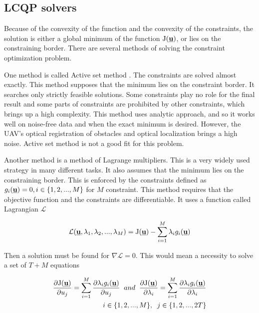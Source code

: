 \documentclass[a4paper,11pt,titlepage]{article}
\newcommand{\Lagr}{\mathcal{L}}
\newcommand{\uvec}{\textbf{\underline{u}}}
\newcommand{\macJ}{\mathrm{J}(\uvec)}
\begin{document}
\subsection{LCQP solvers}

Because of the convexity of the function and the convexity of the constraints, the solution is either a global minimum of the function $\macJ$, or lies on the constraining border. There are several methods of solving the constraint optimization problem.

One method is called Active set method \cite{schittkowski1983convergence}. The constraints are solved almost exactly. This method supposes that the minimum lies on the constraint border. It searches only strictly feasible solutions. Some constraints play no role for the final result and some parts of constraints are prohibited by other constraints, which brings up a high complexity. This method uses analytic approach, and so it works well on noise-free data and when the exact minimum is desired. However, the UAV's optical registration of obstacles and optical localization brings a high noise. Active set method is not a good fit for this problem.

Another method is a method of Lagrange multipliers. This is a very widely used strategy in many different tasks. It also assumes that the minimum lies on the constraining border. This is enforced by the constraints defined as $g_i(\uvec) = 0, i \in \{1, 2, ..., M\}$ for $M$ constraint. This method requires that the objective function and the constraints are differentiable. It uses a function called Lagrangian $\Lagr$

\begin{equation}
\label{Lagrangian}
\Lagr(\uvec, \lambda_1, \lambda_2, ..., \lambda_M) = \mathrm{J}(\uvec) - \sum_{i = 1}^M \lambda_i g_i(\uvec)
\end{equation}

Then a solution must be found for $\nabla \Lagr = 0$. This would mean a necessity to solve a set of $T + M$ equations 

\begin{equation}
\label{Lagrangian}
\begin{split}
\frac{\partial \mathrm{J(\uvec)}}{\partial u_j} =  \sum_{i = 1}^M \frac{\partial \lambda_i g_i(\uvec) }{\partial u_j} \;\; and \;\;\frac{\partial \mathrm{J(\uvec)}}{\partial \lambda_i} =  \sum_{i = 1}^M \frac{\partial \lambda_i g_i(\uvec) }{\partial \lambda_i}\\
i \in \{1, 2, ..., M\},\;\;j \in \{1, 2, ..., 2T\}
\end{split}
\end{equation}
\end{document}
